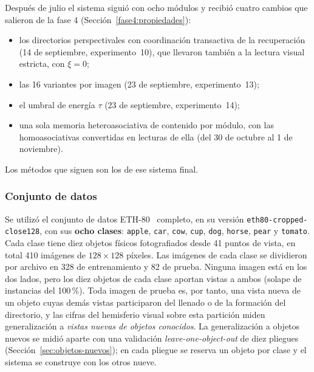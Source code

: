 Después de julio el sistema siguió con ocho módulos y recibió cuatro cambios que salieron
de la fase 4 (Sección~\ref{fase4:propiedades}):
\begin{itemize}
    \item los directorios perspectivales con coordinación transactiva de la recuperación
    (14 de septiembre, experimento~10), que llevaron también a la lectura visual estricta,
    con $\xi = 0$;
    \item las 16 variantes por imagen (23 de septiembre, experimento~13);
    \item el umbral de energía $\tau$ (23 de septiembre, experimento~14);
    \item una sola memoria heteroasociativa de contenido por módulo, con las
    homoasociativas convertidas en lecturas de ella (del 30 de octubre al 1 de noviembre).
\end{itemize}
Los métodos que siguen son los de ese sistema final.

\subsubsection{Conjunto de datos}
\label{sec:dataset}

Se utilizó el conjunto de datos ETH-80~\cite{leibe2003eth80} completo, en su versión
\texttt{eth80-\allowbreak cropped-\allowbreak close128}, con sus
\textbf{ocho clases}: \texttt{apple}, \texttt{car}, \texttt{cow}, \texttt{cup},
\texttt{dog}, \texttt{horse}, \texttt{pear} y \texttt{tomato}.
Cada clase tiene diez objetos físicos fotografiados desde 41 puntos de vista, en total
410 imágenes de $128\times128$ píxeles.
Las imágenes de cada clase se dividieron por archivo en 328 de entrenamiento y 82 de
prueba. Ninguna imagen está en los dos lados, pero los diez objetos de cada clase
aportan vistas a ambos (solape de instancias del 100\,\%).
Toda imagen de prueba es, por tanto, una vista nueva de un objeto cuyas demás vistas
participaron del llenado o de la formación del directorio, y las cifras del hemisferio
visual sobre esta partición miden generalización a \emph{vistas nuevas de objetos
conocidos}.
La generalización a objetos nuevos se midió aparte con una validación
\textit{leave-one-object-out} de diez pliegues (Sección~\ref{sec:objetos-nuevos}); en
cada pliegue se reserva un objeto por clase y el sistema se construye con los otros
nueve.

